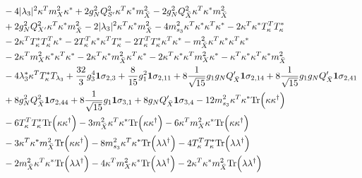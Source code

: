 {\begin{align}
 &-4 |\lambda_3|^2 {\kappa^{T}  m_{X}^2  \kappa^*} +2 g_{N}^{2} Q_{S'}^{2} {\kappa^{T}  \kappa^*  m_{\bar{X}}^2} -2 g_{N}^{2} Q_{\bar{X}}^{2} {\kappa^{T}  \kappa^*  m_{\bar{X}}^2} \nonumber \\ 
 &+2 g_{N}^{2} Q_{X'}^{2} {\kappa^{T}  \kappa^*  m_{\bar{X}}^2} -2 |\lambda_3|^2 {\kappa^{T}  \kappa^*  m_{\bar{X}}^2} -4 m_{s_3}^2 {\kappa^{T}  \kappa^*  \kappa^{T}  \kappa^*} -2 {\kappa^{T}  \kappa^*  T_{\kappa}^{T}  T_{\kappa}^*} \nonumber \\ 
 &-2 {\kappa^{T}  T_{\kappa}^*  T_{\kappa}^{T}  \kappa^*} -2 {T_{\kappa}^{T}  \kappa^*  \kappa^{T}  T_{\kappa}^*} -2 {T_{\kappa}^{T}  T_{\kappa}^*  \kappa^{T}  \kappa^*} - {m_{\bar{X}}^2  \kappa^{T}  \kappa^*  \kappa^{T}  \kappa^*} \nonumber \\ 
 &-2 {\kappa^{T}  m_{X}^2  \kappa^*  \kappa^{T}  \kappa^*} -2 {\kappa^{T}  \kappa^*  m_{\bar{X}}^2  \kappa^{T}  \kappa^*} -2 {\kappa^{T}  \kappa^*  \kappa^{T}  m_{X}^2  \kappa^*} - {\kappa^{T}  \kappa^*  \kappa^{T}  \kappa^*  m_{\bar{X}}^2} \nonumber \\ 
 &-4 \lambda_3^* {\kappa^{T}  T_{\kappa}^*} T_{\lambda_3} +\frac{32}{3} g_{3}^{4} {\bf 1} \sigma_{2,3} +\frac{8}{15} g_{1}^{2} {\bf 1} \sigma_{2,11} +8 \frac{1}{\sqrt{15}} g_1 g_N Q_{\bar{X}}' {\bf 1} \sigma_{2,14} +8 \frac{1}{\sqrt{15}} g_1 g_N Q_{\bar{X}}' {\bf 1} \sigma_{2,41} \nonumber \\ 
 &+8 g_{N}^{2} Q_{\bar{X}}^{2} {\bf 1} \sigma_{2,44} +8 \frac{1}{\sqrt{15}} g_1 {\bf 1} \sigma_{3,1} +8 g_N Q_{\bar{X}}' {\bf 1} \sigma_{3,4} -12 m_{s_3}^2 {\kappa^{T}  \kappa^*} \mbox{Tr}\Big({\kappa  \kappa^{\dagger}}\Big) \nonumber \\ 
 &-6 {T_{\kappa}^{T}  T_{\kappa}^*} \mbox{Tr}\Big({\kappa  \kappa^{\dagger}}\Big) -3 {m_{\bar{X}}^2  \kappa^{T}  \kappa^*} \mbox{Tr}\Big({\kappa  \kappa^{\dagger}}\Big) -6 {\kappa^{T}  m_{X}^2  \kappa^*} \mbox{Tr}\Big({\kappa  \kappa^{\dagger}}\Big) \nonumber \\ 
 &-3 {\kappa^{T}  \kappa^*  m_{\bar{X}}^2} \mbox{Tr}\Big({\kappa  \kappa^{\dagger}}\Big) -8 m_{s_3}^2 {\kappa^{T}  \kappa^*} \mbox{Tr}\Big({\lambda  \lambda^{\dagger}}\Big) -4 {T_{\kappa}^{T}  T_{\kappa}^*} \mbox{Tr}\Big({\lambda  \lambda^{\dagger}}\Big) \nonumber \\ 
 &-2 {m_{\bar{X}}^2  \kappa^{T}  \kappa^*} \mbox{Tr}\Big({\lambda  \lambda^{\dagger}}\Big) -4 {\kappa^{T}  m_{X}^2  \kappa^*} \mbox{Tr}\Big({\lambda  \lambda^{\dagger}}\Big) -2 {\kappa^{T}  \kappa^*  m_{\bar{X}}^2} \mbox{Tr}\Big({\lambda  \lambda^{\dagger}}\Big) \nonumber \\ 

\end{align}}
